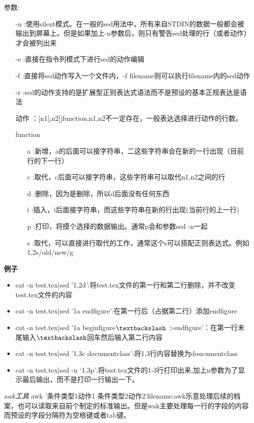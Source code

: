 参数:
\begin{itemize}
	\item[-n]:使用silent模式。在一般的sed用法中，所有来自STDIN的数据一般都会被输出到屏幕上。但是如果加上-n参数后，则只有警告sed处理的行（或者动作）才会被列出来
	\item[-e]:直接在指令列模式下进行sed的动作编辑
	\item[-f]:直接将sed动作写入一个文件内，-f filename则可以执行filename内的sed动作
	\item[-r]:sed的动作支持的是扩展型正则表达式语法而不是预设的基本正规表达是语法
	\item[动作]：[n1[,n2]]function,n1,n2不一定存在，一般表达选择进行动作的行数。
	\item[function]
		\begin{itemize}
			\item[a]:新增，a的后面可以接字符串，二这些字符串会在新的一行出现（目前行的下一行）
			\item[c]:取代，c后面可以接字符串，这些字符串可以取代n1,n2之间的行
			\item[d]:删除，因为是删除，所以d后面没有任何东西
			\item[i]:插入，i后面接字符串，而这些字符串在新的行出现(当前行的上一行)
			\item[p]:打印，将摸个选择的数据输出。通常p会和参数sed -n一起
			\item[s]:取代，可以直接进行取代的工作，通常这个s可以搭配正则表达式。例如1,2s/old/new/g
		\end{itemize}
\end{itemize}
\textbf{例子}
\begin{itemize}
\item cat -n test.tex|sed '1,2d':将test.tex文件的第一行和第二行删除，并不改变test.tex文件的内容

\item cat -n test.tex|sed '1a end{figure}':在第一行后（占据第二行）添加end{figure}
\item cat -n test.tex|sed '1a begin{figure}$\textbackslash$
	>end{figure}'：在第一行末尾输入$\textbackslash$回车然后输入第二行内容
\item cat -n test.tex|sed '1,3c documentclass':将1,3行内容替换为doucumentclass
\item cat -n test.tex|sed -n ‘1,3p’:将test.tex文件的1-3行打印出来,加上n参数为了显示最后输出，而不是打印一行输出一下。
\end{itemize}
\textit{awk工具}
awk '条件类型1{动作1} 条件类型2{动作2}'filename:awk乐意处理后续的档案，也可以读取来自前个制定的标准输出。但是wak主要处理每一行的字段的内容而预设的字段分隔符为空格键或者tab键。

